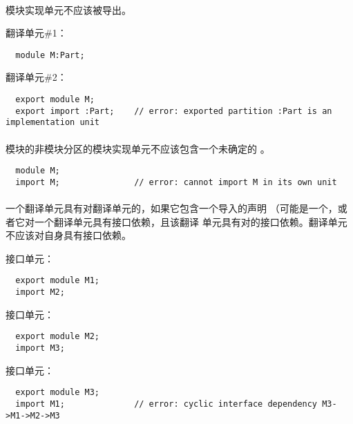 \paragraph{} %
模块实现单元不应该被导出。

\begin{example}

  翻译单元\#1：
  \begin{lstlisting}
  module M:Part;
  \end{lstlisting}
  翻译单元\#2：
  \begin{lstlisting}
  export module M;
  export import :Part;    // error: exported partition :Part is an implementation unit
  \end{lstlisting}
\end{example}

\paragraph{} %
模块的非模块分区的模块实现单元不应该包含一个未确定的
。

\begin{example}
  \begin{lstlisting}
  module M;
  import M;               // error: cannot import M in its own unit
  \end{lstlisting}
\end{example}

\paragraph{} %
一个翻译单元具有对翻译单元的，如果它包含一个导入的声明
（可能是一个，或者它对一个翻译单元具有接口依赖，且该翻译
单元具有对的接口依赖。翻译单元不应该对自身具有接口依赖。

\begin{example}

  接口单元：
  \begin{lstlisting}
  export module M1;
  import M2;
  \end{lstlisting}
  接口单元：
  \begin{lstlisting}
  export module M2;
  import M3;
  \end{lstlisting}
  接口单元：
  \begin{lstlisting}
  export module M3;
  import M1;              // error: cyclic interface dependency M3->M1->M2->M3
  \end{lstlisting}
\end{example}

